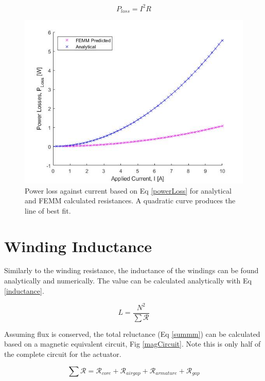\documentclass[a4paper]{IEEEtran}
\begin{document}
    \begin{equation}
        P_{loss} = I^2 R
        \label{powerLoss}
    \end{equation}
    
    \begin{figure}[ht]
        \includegraphics[width = \linewidth]{ResistanceWindingLoss.jpg}
        \caption{Power loss against current based on Eq \ref{powerLoss} for analytical and FEMM calculated resistances. A quadratic curve produces the line of best fit.}
        \label{windingLoss} 
    \end{figure}

\label{windRes}

\section{Winding Inductance}
    Similarly to the winding resistance, the inductance of the windings can be found analytically and numerically. The value can be calculated analytically with Eq \ref{inductance}. 

    \begin{equation}
        L = \frac{N^2}{\sum{\mathcal{R}}}
        \label{inductance}
    \end{equation}

    Assuming flux is conserved, the total reluctance (Eq \ref{summm}) can be calculated based on a magnetic equivalent circuit, Fig \ref{magCircuit}. Note this is only half of the complete circuit for the actuator.


    \begin{equation}
        \sum{\mathcal{R}} = \mathcal{R}_{core} + \mathcal{R}_{airgap} + \mathcal{R}_{armature} + \mathcal{R}_{gap}
        \label{summm}
    \end{equation}
\end{document}

